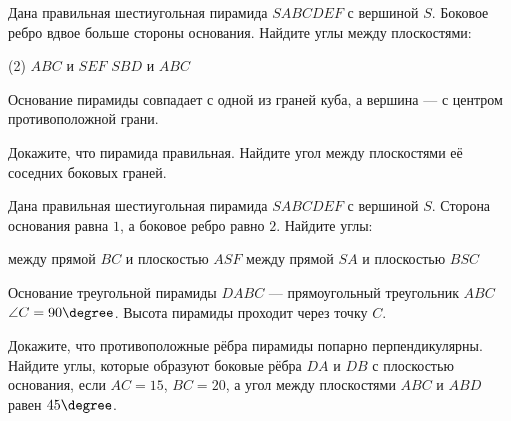 \begin{class}[number=3]
	\begin{listofex}
		\item Дана правильная шестиугольная пирамида \(SABCDEF\) с вершиной \(S\). Боковое ребро вдвое больше стороны основания. Найдите углы между плоскостями:
		\begin{tasks}(2)
			\task \( ABC \) и \(SEF\)
			\task \( SBD \) и \(ABC\)
		\end{tasks}
		\item Основание пирамиды совпадает с одной из граней куба, а вершина --- с центром противоположной грани.
		\begin{tasks}
			\task Докажите, что пирамида правильная.
			\task Найдите угол между плоскостями её соседних боковых граней.
		\end{tasks}
		\item Дана правильная шестиугольная пирамида \(SABCDEF\) с вершиной \(S\). Сторона основания равна \(1\), а боковое ребро равно \(2\). Найдите углы:
		\begin{tasks}
			\task между прямой \(BC\) и плоскостью \(ASF\)
			\task между прямой \(SA\) и плоскостью \(BSC\)
		\end{tasks}
		\item Основание треугольной пирамиды \(DABC\) --- прямоугольный треугольник \(ABC\) \(\angle C = 90 \degree\). Высота пирамиды проходит через точку \(C\).
		\begin{tasks}
			\task Докажите, что противоположные рёбра пирамиды попарно перпендикулярны.
			\task Найдите углы, которые образуют боковые рёбра \(DA\) и \(DB\) с плоскостью основания, если \(AC =15\), \(BC =20\), а угол между плоскостями \(ABC\) и \(ABD\) равен \(45\degree\).
		\end{tasks}
	\end{listofex}
\end{class}

